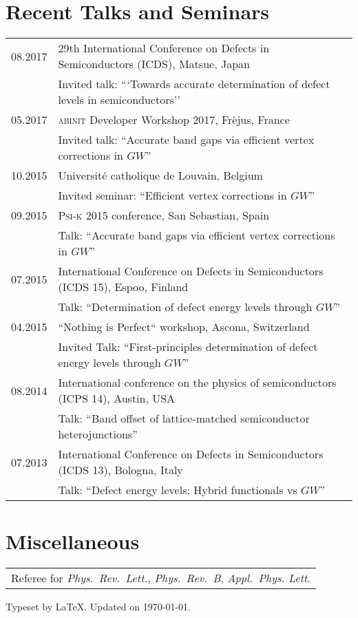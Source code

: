 \documentclass[a4paper, 11pt, DIV=15,headings=normal]{scrartcl}
\begin{document}
\section*{Recent Talks and Seminars}
\begin{tabular}{ll}
08.2017         & 29th International Conference on Defects in Semiconductors (ICDS), Matsue, Japan  \\
                & Invited talk: ```Towards accurate determination of defect levels in               semiconductors'' \\
05.2017         & \textsc{abinit} Developer Workshop 2017, Fr\`{e}jus, France \\
                & Invited talk: ``Accurate band gaps via efficient vertex corrections in $GW$''\\
10.2015         & Universit\'{e} catholique de Louvain, Belgium \\
                & Invited seminar: ``Efficient vertex corrections in $GW$'' \\
09.2015         & \textsc{Psi-k} 2015 conference, San Sebastian, Spain \\
                & Talk: ``Accurate band gaps via efficient vertex corrections in $GW$'' \\
07.2015         & International Conference on Defects in Semiconductors (ICDS 15), Espoo, Finland \\
                & Talk: ``Determination of defect energy levels through $GW$''\\
04.2015         & ``Nothing is Perfect`` workshop, Ascona, Switzerland \\
                & Invited Talk: ``First-principles determination of defect energy levels through $GW$'' \\
08.2014         & International conference on the physics of semiconductors (ICPS 14), Austin, USA \\
                & Talk: ``Band offset of lattice-matched semiconductor heterojunctions'' \\
07.2013         & International Conference on Defects in Semiconductors (ICDS 13), Bologna, Italy \\
                & Talk: ``Defect energy levels: Hybrid functionals vs $GW$'' \\
\end{tabular}


\section*{Miscellaneous}
\begin{tabular}{l}
Referee for \textit{Phys.\ Rev.\ Lett.}, \textit{Phys.\ Rev.\ B}, \textit{Appl.\ Phys. Lett}.
\end{tabular}

\begin{refsection}[cv.bib]
\nocite{*}
\printbibliography[resetnumbers=true, title={Publications (chronological order)}]
\end{refsection}

\vspace{6mm}

\begin{minipage}{0.4\linewidth}
\scriptsize Typeset by \LaTeX. Updated on \today.
\end{minipage}
\end{document}
